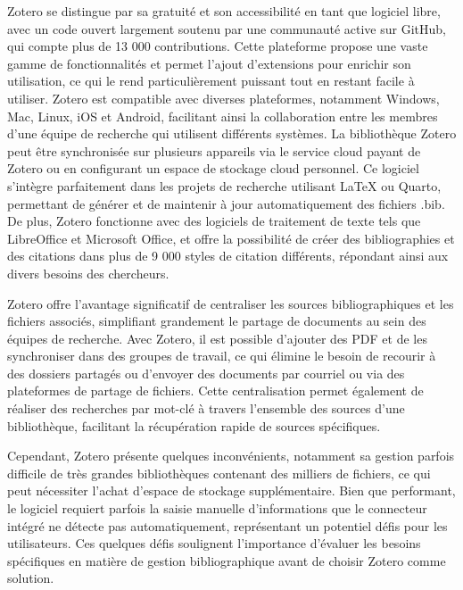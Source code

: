 \documentclass[
  letterpaper,
  DIV=11,
  numbers=noendperiod]{scrreprt}
\begin{document}
Zotero se distingue par sa gratuité et son accessibilité en tant que
logiciel libre, avec un code ouvert largement soutenu par une communauté
active sur GitHub, qui compte plus de 13 000 contributions. Cette
plateforme propose une vaste gamme de fonctionnalités et permet l'ajout
d'extensions pour enrichir son utilisation, ce qui le rend
particulièrement puissant tout en restant facile à utiliser. Zotero est
compatible avec diverses plateformes, notamment Windows, Mac, Linux, iOS
et Android, facilitant ainsi la collaboration entre les membres d'une
équipe de recherche qui utilisent différents systèmes. La bibliothèque
Zotero peut être synchronisée sur plusieurs appareils via le service
cloud payant de Zotero ou en configurant un espace de stockage cloud
personnel. Ce logiciel s'intègre parfaitement dans les projets de
recherche utilisant LaTeX ou Quarto, permettant de générer et de
maintenir à jour automatiquement des fichiers .bib. De plus, Zotero
fonctionne avec des logiciels de traitement de texte tels que
LibreOffice et Microsoft Office, et offre la possibilité de créer des
bibliographies et des citations dans plus de 9 000 styles de citation
différents, répondant ainsi aux divers besoins des chercheurs.

Zotero offre l'avantage significatif de centraliser les sources
bibliographiques et les fichiers associés, simplifiant grandement le
partage de documents au sein des équipes de recherche. Avec Zotero, il
est possible d'ajouter des PDF et de les synchroniser dans des groupes
de travail, ce qui élimine le besoin de recourir à des dossiers partagés
ou d'envoyer des documents par courriel ou via des plateformes de
partage de fichiers. Cette centralisation permet également de réaliser
des recherches par mot-clé à travers l'ensemble des sources d'une
bibliothèque, facilitant la récupération rapide de sources spécifiques.

Cependant, Zotero présente quelques inconvénients, notamment sa gestion
parfois difficile de très grandes bibliothèques contenant des milliers
de fichiers, ce qui peut nécessiter l'achat d'espace de stockage
supplémentaire. Bien que performant, le logiciel requiert parfois la
saisie manuelle d'informations que le connecteur intégré ne détecte pas
automatiquement, représentant un potentiel défis pour les utilisateurs.
Ces quelques défis soulignent l'importance d'évaluer les besoins
spécifiques en matière de gestion bibliographique avant de choisir
Zotero comme solution.
\end{document}
